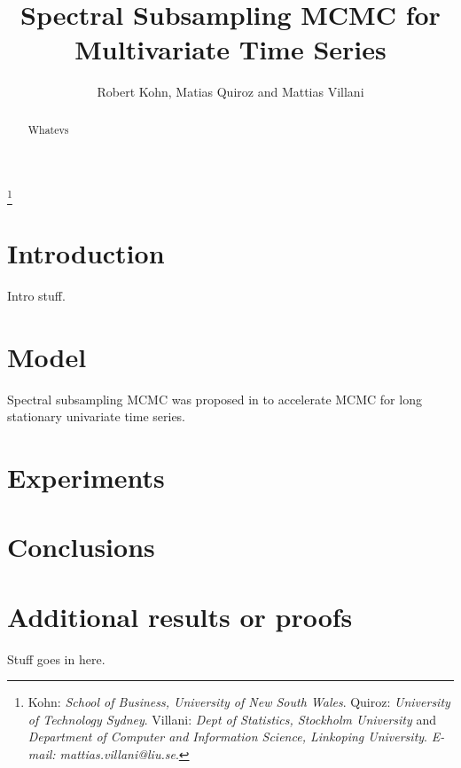 \documentclass[11pt,oneside,english]{amsart}
\numberwithin{equation}{section}
\numberwithin{figure}{section}
\theoremstyle{plain}
\numberwithin{equation}{section}
\begin{document}
\title[Multivariate Spectral Subsampling MCMC]{Spectral Subsampling MCMC for Multivariate Time Series}
\author{Robert Kohn, Matias Quiroz and Mattias Villani}
\thanks{
Kohn: \textit{School of Business, University of New South Wales}. 
Quiroz: \textit{University of Technology Sydney}.
Villani: \textit{Dept of Statistics, Stockholm University} and 
\textit{Department of Computer and Information Science, Linkoping University}.
\textit{E-mail: mattias.villani@liu.se}.
}

\begin{abstract}
Whatevs 
\end{abstract}

\maketitle

\section{Introduction}

Intro stuff.

\section{Model}

Spectral subsampling MCMC was proposed in \citet{salomone2019spectral} to accelerate
MCMC for long stationary univariate time series.

\section{Experiments}

\section{Conclusions}





\appendix

\section{Additional results or proofs}
Stuff goes in here.
\end{document}
